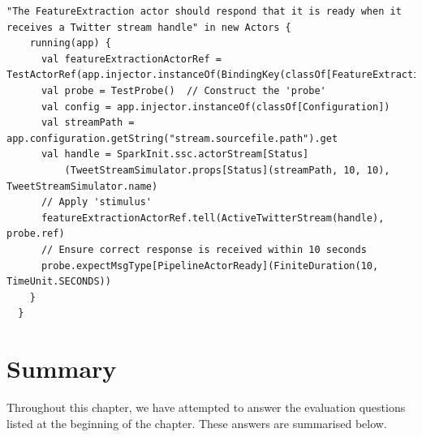 \documentclass{l4proj}
\begin{document}
\begin{lstlisting}[label=integrationtest,caption=Ensuring that the FeatureExtraction actor is correctly instantiated.]
"The FeatureExtraction actor should respond that it is ready when it receives a Twitter stream handle" in new Actors {
    running(app) {
      val featureExtractionActorRef = TestActorRef(app.injector.instanceOf(BindingKey(classOf[FeatureExtraction])))
      val probe = TestProbe()  // Construct the 'probe'
      val config = app.injector.instanceOf(classOf[Configuration])
      val streamPath = app.configuration.getString("stream.sourcefile.path").get
      val handle = SparkInit.ssc.actorStream[Status]
          (TweetStreamSimulator.props[Status](streamPath, 10, 10), TweetStreamSimulator.name)
      // Apply 'stimulus'    
      featureExtractionActorRef.tell(ActiveTwitterStream(handle), probe.ref)
      // Ensure correct response is received within 10 seconds
      probe.expectMsgType[PipelineActorReady](FiniteDuration(10, TimeUnit.SECONDS))
    }
  }
\end{lstlisting}    

    \section{Summary}
    Throughout this chapter, we have attempted to answer the evaluation questions listed at the beginning of the chapter. These answers are summarised below.
    
\end{document}
